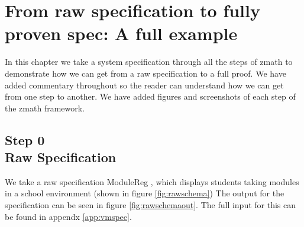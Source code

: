 \chapter{From raw specification to fully proven spec: A full example}
\label{ch:fullexample}

In this chapter we take a system specification through all the steps of \gls{zmath} to demonstrate how we can get from a raw specification to a full proof. We have added commentary throughout so the reader can understand how we can get from one step to another. We have added figures and screenshots of each step of the \gls{zmath} framework.

\section{Step 0\\Raw Specification}
We take a raw specification ModuleReg \cite{essenceofz}, which displays students taking modules in a school environment (shown in figure \ref{fig:rawschema}) The output for the specification can be seen in figure \ref{fig:rawschemaout}. The full input for this can be found in appendx \ref{app:vmspec}.


